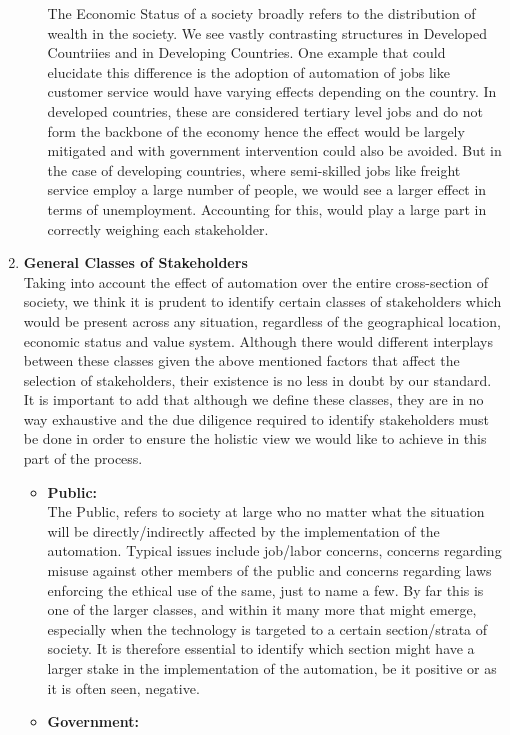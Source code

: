 \begin{enumerate}[a]
\begin{itemize}
The Economic Status of a society broadly refers to the distribution of wealth in the society. We see vastly contrasting structures in Developed Countriies and in Developing Countries. One example that could elucidate this difference is the adoption of automation of jobs like customer service would have varying effects depending on the country. In developed countries, these are considered tertiary level jobs and do not form the backbone of the economy hence the effect would be largely mitigated and with government intervention could also be avoided. But in the case of developing countries, where semi-skilled jobs like freight service employ a large number of people, we would see a larger effect in terms of unemployment. Accounting for this, would play a large part in correctly weighing each stakeholder.
\end{itemize}
\item \textbf{General Classes of Stakeholders}\\
Taking into account the effect of automation over the entire cross-section of society, we think it is prudent to identify certain classes of stakeholders which would be present across any situation, regardless of the geographical location, economic status and value system. Although there would different interplays between these classes given the above mentioned factors that affect the selection of stakeholders, their existence is no less in doubt by our standard.\\
It is important to add that although we define these classes, they are in no way exhaustive and the due diligence required to identify stakeholders must be done in order to ensure the holistic view we would like to achieve in this part of the process.
\begin{itemize}
\item \textbf{Public:}\\
The Public, refers to society at large who no matter what the situation will be directly/indirectly affected by the implementation of the automation. Typical issues include job/labor concerns, concerns regarding misuse against other members of the public and concerns regarding laws enforcing the ethical use of the same, just to name a few. By far this is one of the larger classes, and within it many more that might emerge, especially when the technology is targeted to a certain section/strata of society. It is therefore essential to identify which section might have a larger stake in the implementation of the automation, be it positive or as it is often seen, negative.
\item \textbf{Government:}\\

\end{itemize}
\end{enumerate}
